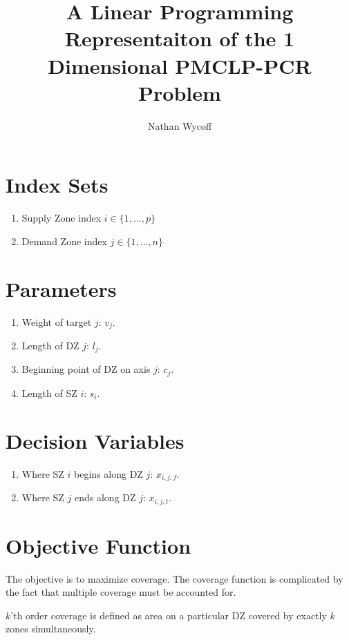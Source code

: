\documentclass[a4paper]{article}
\title{A Linear Programming Representaiton of the 1 Dimensional PMCLP-PCR Problem}
\author{Nathan Wycoff}
\begin{document}
\maketitle

\section{Index Sets}

\begin{enumerate}
    \item Supply Zone index $i \in \{1, \ldots, p\}$
    \item Demand Zone index $j \in \{1, \ldots, n\}$
\end{enumerate}

\section{Parameters}

\begin{enumerate}
    \item Weight of target $j$: $v_j$.
    \item Length of DZ $j$: $l_j$.
    \item Beginning point of DZ on axis $j$: $c_{j}$.
    \item Length of SZ $i$: $s_i$.
\end{enumerate}

\section{Decision Variables}

\begin{enumerate}
    \item Where SZ $i$ begins along DZ $j$: $x_{i,j,f}$.
    \item Where SZ $j$ ends along DZ $j$: $x_{i,j,t}$.
\end{enumerate}

\section{Objective Function}

The objective is to maximize coverage. The coverage function is complicated by the fact that multiple coverage must be accounted for. 

$k$'th order coverage is defined as area on a particular DZ covered by exactly $k$ zones simultaneously. 
\end{document}
